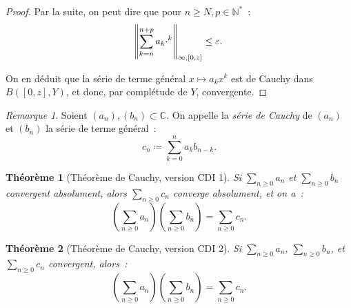 \documentclass{report}
\newtheorem{thm}{Théorème}[chapter]
\theoremstyle{definition}
\theoremstyle{remark}
\newtheorem*{rmq}{Remarque}
\numberwithin{equation}{section}
\newcommand{\C}{\mathbb C}
\newcommand{\N}{\mathbb N}
\newcommand{\Ns}{\N^{*}}
\newcommand{\CDII}{{CDI 1}}
\newcommand{\CDIII}{{CDI 2}}
\begin{document}
\begin{proof}
			Par la suite, on peut dire que pour $n \geq N, p \in \Ns$~:
			\begin{equation}
				\norm {\sum_{k=n}^{n+p}a_k \cdot^k}_{\infty, [0, z]} \leq \varepsilon.
			\end{equation}

			On en déduit que la série de terme général $x \mapsto a_kx^k$ est de Cauchy dans $B([0, z], Y)$, et donc, par complétude de $Y$, convergente.
			\end{proof}

			\begin{rmq} Soient $(a_n), (b_n) \subset \C$. On appelle la \textit{série de Cauchy} de $(a_n)$ et $(b_n)$ la série de terme général~:
			\begin{equation}
				c_n \coloneqq \sum_{k=0}^na_kb_{n-k}.
			\end{equation}
			\end{rmq}

			\begin{thm}[Théorème de Cauchy, version \CDII]\label{thm:CauchyCDI1} Si $\sum_{n \geq 0}a_n$ et $\sum_{n \geq 0}b_n$ convergent absolument,
			alors $\sum_{n \geq 0}c_n$ converge absolument, et on a~:
			\begin{equation}
				\left(\sum_{n \geq 0}a_n\right)\left(\sum_{n \geq 0}b_n\right) = \sum_{n \geq 0}c_n.
			\end{equation}
			\end{thm}

			\begin{thm}[Théorème de Cauchy, version \CDIII] Si $\sum_{n \geq 0}a_n$, $\sum_{n \geq 0}b_n$, et $\sum_{n \geq 0}c_n$ convergent, alors~:
			\begin{equation}
				\left(\sum_{n \geq 0}a_n\right)\left(\sum_{n \geq 0}b_n\right) = \sum_{n \geq 0}c_n.
			\end{equation}
			\end{thm}
\end{document}

